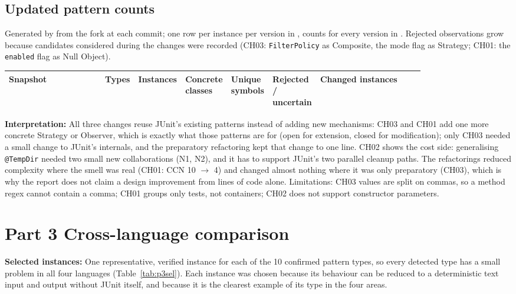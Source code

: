 \documentclass[11pt,a4paper]{article}
\newcommand{\entry}[1]{\textbf{#1:} }
\begin{document}
\subsection{Updated pattern counts}
Generated by  from the fork at each commit; one row per instance per version in , counts for every version in . Rejected observations grow because candidates considered during the changes were recorded (CH03: \texttt{FilterPolicy} as Composite, the mode flag as Strategy; CH01: the \texttt{enabled} flag as Null Object).

\begin{longtable}{@{}p{0.23\linewidth}p{0.05\linewidth}p{0.07\linewidth}p{0.07\linewidth}p{0.07\linewidth}p{0.08\linewidth}p{0.25\linewidth}@{}}\toprule
Snapshot & Types & Instances & Concrete classes & Unique symbols & Rejected / uncertain & Changed instances\\\midrule\endhead
\bottomrule\end{longtable}

\entry{Interpretation}All three changes reuse JUnit's existing patterns instead of adding new mechanisms: CH03 and CH01 add one more concrete Strategy or Observer, which is exactly what those patterns are for (open for extension, closed for modification); only CH03 needed a small change to JUnit's internals, and the preparatory refactoring kept that change to one line. CH02 shows the cost side: generalising \texttt{@TempDir} needed two small new collaborations (N1, N2), and it has to support JUnit's two parallel cleanup paths. The refactorings reduced complexity where the smell was real (CH01: CCN 10 $\rightarrow$ 4) and changed almost nothing where it was only preparatory (CH03), which is why the report does not claim a design improvement from lines of code alone. Limitations: CH03 values are split on commas, so a method regex cannot contain a comma; CH01 groups only tests, not containers; CH02 does not support constructor parameters.

\section{Part 3 Cross-language comparison}
\entry{Selected instances}One representative, verified instance for each of the 10 confirmed pattern types, so every detected type has a small problem in all four languages (Table~\ref{tab:p3sel}). Each instance was chosen because its behaviour can be reduced to a deterministic text input and output without JUnit itself, and because it is the clearest example of its type in the four areas.
\end{document}
